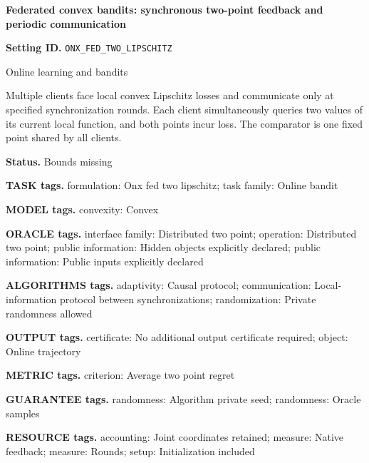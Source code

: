 \documentclass[10pt,a4paper]{article}
\begin{document}
\raggedright

{\LARGE\bfseries\sffamily\color{AtlasNavy} Federated convex bandits: synchronous two-point feedback and periodic communication\par}\vspace{5pt}


\textbf{Setting ID.} \texttt{ONX\_\allowbreak{}FED\_\allowbreak{}TWO\_\allowbreak{}LIPSCHITZ}



Online learning and bandits



Multiple clients face local convex Lipschitz losses and communicate only at specified synchronization rounds. Each client simultaneously queries two values of its current local function, and both points incur loss. The comparator is one fixed point shared by all clients.



\textbf{Status.} Bounds missing



\textbf{TASK tags.} formulation: Onx fed two lipschitz; task family: Online bandit



\textbf{MODEL tags.} convexity: Convex



\textbf{ORACLE tags.} interface family: Distributed two point; operation: Distributed two point; public information: Hidden objects explicitly declared; public information: Public inputs explicitly declared



\textbf{ALGORITHMS tags.} adaptivity: Causal protocol; communication: Local-information protocol between synchronizations; randomization: Private randomness allowed



\textbf{OUTPUT tags.} certificate: No additional output certificate required; object: Online trajectory



\textbf{METRIC tags.} criterion: Average two point regret



\textbf{GUARANTEE tags.} randomness: Algorithm private seed; randomness: Oracle samples



\textbf{RESOURCE tags.} accounting: Joint coordinates retained; measure: Native feedback; measure: Rounds; setup: Initialization included
\end{document}
